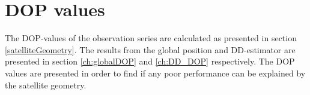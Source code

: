 \section{DOP values}\label{sectionDOP}
The DOP-values of the observation series are calculated as presented in section \ref{satelliteGeometry}. The results from the global position and DD-estimator are presented in section \ref{ch:globalDOP} and \ref{ch:DD_DOP} respectively. The DOP values are presented in order to find if any poor performance can be explained by the satellite geometry.

